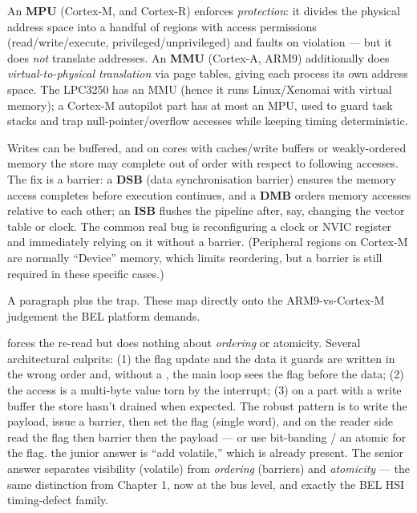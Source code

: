 An \textbf{MPU} (Cortex-M, and Cortex-R) enforces \emph{protection}: it divides
the physical address space into a handful of regions with access permissions
(read/write/execute, privileged/unprivileged) and faults on violation --- but
it does \emph{not} translate addresses. An \textbf{MMU} (Cortex-A, ARM9)
additionally does \emph{virtual-to-physical translation} via page tables, giving
each process its own address space. The LPC3250 has an MMU (hence it runs
Linux/Xenomai with virtual memory); a Cortex-M autopilot part has at most an
MPU, used to guard task stacks and trap null-pointer/overflow accesses while
keeping timing deterministic.

Writes can be buffered, and on cores with caches/write buffers or weakly-ordered
memory the store may complete out of order with respect to following accesses.
The fix is a barrier: a \textbf{DSB} (data synchronisation barrier) ensures the
memory access completes before execution continues, and a \textbf{DMB} orders
memory accesses relative to each other; an \textbf{ISB} flushes the pipeline
after, say, changing the vector table or clock. The common real bug is
reconfiguring a clock or NVIC register and immediately relying on it without a
barrier. (Peripheral regions on Cortex-M are normally ``Device'' memory, which
limits reordering, but a barrier is still required in these specific cases.)

%
{A paragraph plus the trap. These map directly onto the ARM9-vs-Cortex-M
judgement the BEL platform demands.}

 forces the re-read but does nothing about \emph{ordering} or
atomicity. Several architectural culprits: (1) the flag update and the data it
guards are written in the wrong order and, without a , the main loop
sees the flag before the data; (2) the access is a multi-byte value torn by the
interrupt; (3) on a part with a write buffer the store hasn't drained when
expected. The robust pattern is to write the payload, issue a barrier, then set
the flag (single word), and on the reader side read the flag then barrier then
the payload --- or use bit-banding / an atomic for the flag. \trap the junior
answer is ``add volatile,'' which is already present. The senior answer
separates visibility (volatile) from \emph{ordering} (barriers) and
\emph{atomicity} --- the same distinction from Chapter 1, now at the bus level,
and exactly the BEL HSI timing-defect family.


